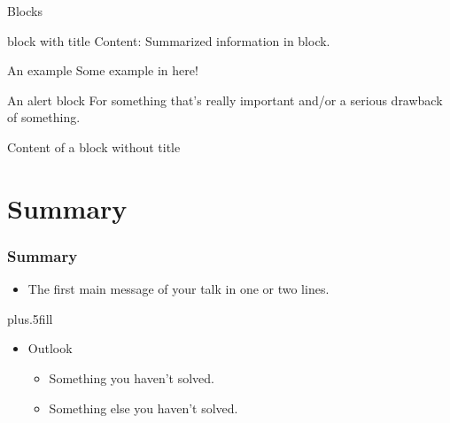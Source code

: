 \documentclass[pdftex]{beamer}
\begin{document}
\begin{frame}{Blocks}
  \begin{block}{block with title}
    Content: Summarized information in block.
  \end{block}
  \begin{exampleblock}{An example}
    Some example in here!
  \end{exampleblock}
  \begin{alertblock}{An alert block}
    For something that's really important and/or a serious drawback of something.
  \end{alertblock}
  \begin{block}{}
    Content of a block without title
  \end{block}
\end{frame}


\section*{Summary}

\begin{frame}
  \frametitle<presentation>{Summary}

  \begin{itemize}
  \item The \alert{first main message} of your talk in one or two lines.
  \end{itemize}

  \vskip0pt plus.5fill
  \begin{itemize}
  \item Outlook
    \begin{itemize}
    \item Something you haven't solved.
    \item Something else you haven't solved.
    \end{itemize}
  \end{itemize}
\end{frame}
\end{document}

